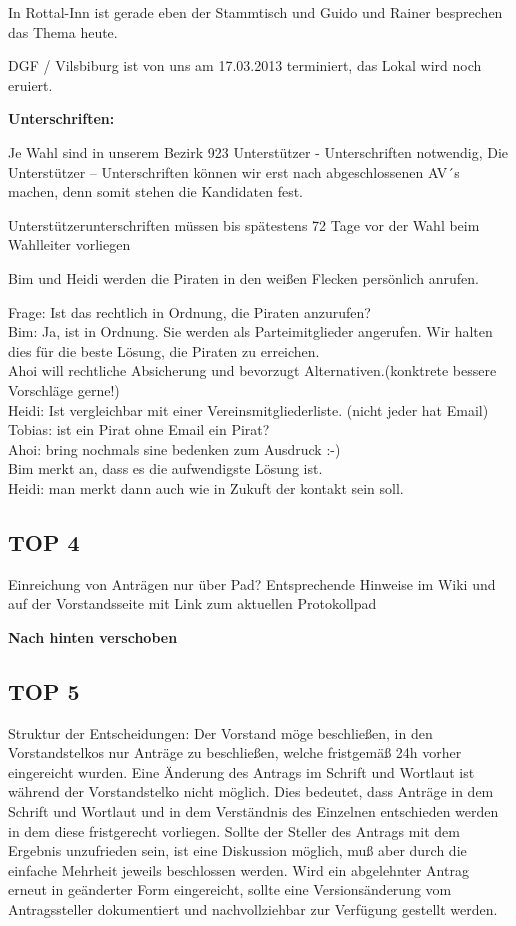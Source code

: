 \documentclass{protokoll}
\begin{document}
In Rottal-Inn ist gerade eben der Stammtisch und Guido und Rainer besprechen das Thema heute.

DGF / Vilsbiburg ist von uns am 17.03.2013 terminiert, das Lokal wird noch eruiert.

\textbf{Unterschriften:}

Je Wahl sind in unserem Bezirk 923 Unterstützer - Unterschriften notwendig,
Die Unterstützer – Unterschriften können wir erst nach abgeschlossenen AV´s machen, denn somit stehen die Kandidaten fest.

Unterstützerunterschriften müssen bis spätestens 72 Tage vor der Wahl beim Wahlleiter vorliegen

Bim und Heidi werden die Piraten in den weißen Flecken persönlich anrufen.

Frage:  Ist das rechtlich in Ordnung, die Piraten anzurufen?\\
Bim: Ja, ist in Ordnung.  Sie werden als Parteimitglieder angerufen.  Wir halten dies für die beste Lösung, 
     die Piraten zu erreichen.\\
Ahoi will rechtliche Absicherung und bevorzugt Alternativen.(konktrete bessere Vorschläge gerne!)\\
Heidi:  Ist vergleichbar mit einer Vereinsmitgliederliste. (nicht jeder hat Email)\\
Tobias: ist ein Pirat ohne Email ein Pirat?\\
Ahoi: bring nochmals sine bedenken zum Ausdruck :-)\\
Bim merkt an, dass es die aufwendigste Lösung ist.\\
Heidi: man merkt dann auch wie in Zukuft der kontakt sein soll.\\

\subsection{TOP 4} 
Einreichung von Anträgen nur über Pad?
Entsprechende Hinweise im Wiki und auf der Vorstandsseite mit Link zum aktuellen Protokollpad

\textbf{Nach hinten verschoben}

\subsection{TOP 5} 

Struktur der Entscheidungen: Der Vorstand möge beschließen, in den
Vorstandstelkos nur Anträge zu beschließen, welche fristgemäß 24h
vorher eingereicht wurden. Eine Änderung des Antrags im Schrift und
Wortlaut ist während der Vorstandstelko nicht möglich. Dies bedeutet,
dass Anträge in dem Schrift und Wortlaut und in dem Verständnis des
Einzelnen entschieden werden in dem diese fristgerecht
vorliegen. Sollte der Steller des Antrags mit dem Ergebnis unzufrieden
sein, ist eine Diskussion möglich, muß aber durch die einfache
Mehrheit jeweils beschlossen werden. Wird ein abgelehnter Antrag
erneut in geänderter Form eingereicht, sollte eine Versionsänderung
vom Antragssteller dokumentiert und nachvollziehbar zur Verfügung
gestellt werden.
\end{document}
